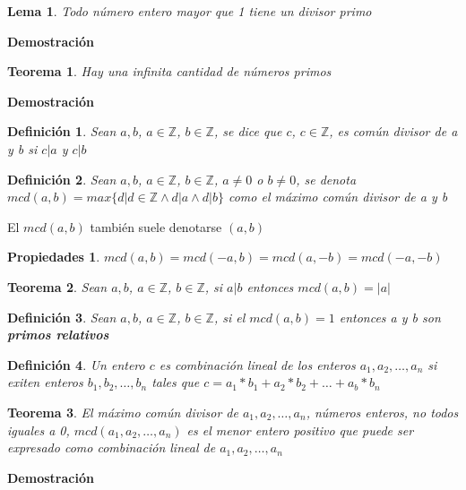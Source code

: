 \documentclass[a4paper,1pt]{report}
\newtheorem*{teo}{Teorema}
\newtheorem*{dfn}{Definición}
\newtheorem*{lem}{Lema}
\newtheorem*{prp}{Propiedades}
\begin{document}
\begin{lem}
 Todo número entero mayor que 1 tiene un divisor primo
\end{lem}

\textbf{Demostración}

\begin{teo}
 Hay una infinita cantidad de números primos
\end{teo}

\textbf{Demostración}

\begin{dfn}
 Sean $a,b$, $a\in\mathbb{Z}$, $b\in\mathbb{Z}$, se dice que $c$, $c\in\mathbb{Z}$, es común divisor de a y b si $c|a$ y $c|b$
\end{dfn}


\begin{dfn}
 Sean $a,b$, $a\in\mathbb{Z}$, $b\in\mathbb{Z}$, $a\neq 0$ o $b\neq 0$, se denota\\ $mcd(a,b)=max\{d|   d\in\mathbb{Z}\wedge d|a\wedge d|b\}$ como el máximo común divisor de a y b
\end{dfn}

El $mcd(a,b)$ también suele denotarse $(a,b)$ 

\begin{prp}
 $mcd(a,b)=mcd(-a,b)=mcd(a,-b)=mcd(-a,-b)$
\end{prp}

\begin{teo}
 Sean $a,b$, $a\in\mathbb{Z}$, $b\in\mathbb{Z}$, si $a|b$ entonces $mcd(a,b)=|a|$
\end{teo}


\begin{dfn}
 Sean $a,b$, $a\in\mathbb{Z}$, $b\in\mathbb{Z}$, si el $mcd(a,b)=1$ entonces a y b son \textbf{primos relativos}
\end{dfn}

\begin{dfn}
 Un entero $c$ es combinación lineal de los enteros $a_1,a_2,\dots,a_n$ si exiten enteros $b_1,b_2,\dots,b_n$ tales que $c=a_1*b_1+a_2*b_2+\dots+a_b*b_n$
\end{dfn}

\begin{teo}
 El máximo común divisor de  $a_1,a_2,\dots,a_n$, números enteros, no todos iguales a 0, $mcd(a_1,a_2,\dots,a_n)$ es el menor entero positivo que puede ser expresado como combinación lineal de $a_1,a_2,\dots,a_n$
\end{teo}

\textbf{Demostración}
\end{document}
